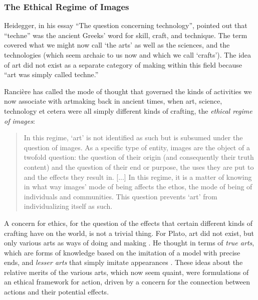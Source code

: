 \documentclass[letterpaper]{article}
\begin{document}
    \subsubsection{The Ethical Regime of Images}

    Heidegger, in his essay “The question concerning technology”, pointed out that “techne” was the ancient Greeks' word for skill, craft, and technique. The term covered what we might now call ‘the arts’ as well as the sciences, and the technologies (which seem archaic to us now and which we call ‘crafts’). The idea of art did not exist as a separate category of making within this field because “art was simply called techne.” \citep[p34]{HeideggerThQstnCncrngTchnlgy1954}
    
    Rancière has called the mode of thought that governed the kinds of activities we now associate with artmaking back in ancient times, when art, science, technology et cetera were all simply different kinds of crafting, the \emph{ethical regime of images}:

    \begin{quote}
        In this regime, ‘art’ is not identified as such but is subsumed under the question of images. As a specific type of entity, images are the object of a twofold question: the question of their origin (and consequently their truth content) and the question of their end or purpose, the uses they are put to and the effects they result in. [...] In this regime, it is a matter of knowing in what way images' mode of being affects the ethos, the mode of being of individuals and communities. This question prevents ‘art’ from individualizing itself as such. \citep[pp.20–21]{RancierPltcsOfThAsthtcs2004}
    \end{quote}

    A concern for ethics, for the question of the effects that certain different kinds of crafting have on the world, is not a trivial thing. For Plato, art did not exist, but only various arts as ways of doing and making \citep[p.20]{RancierPltcsOfThAsthtcs2004}. He thought in terms of \emph{true arts}, which are forms of knowledge based on the imitation of a model with precise ends, and \emph{lesser arts} that simply imitate appearances \citep[p.20]{RancierPltcsOfThAsthtcs2004}. These ideas about the relative merits of the various arts, which now seem quaint, were formulations of an ethical framework for action, driven by a concern for the connection between actions and their potential effects.
\end{document}
